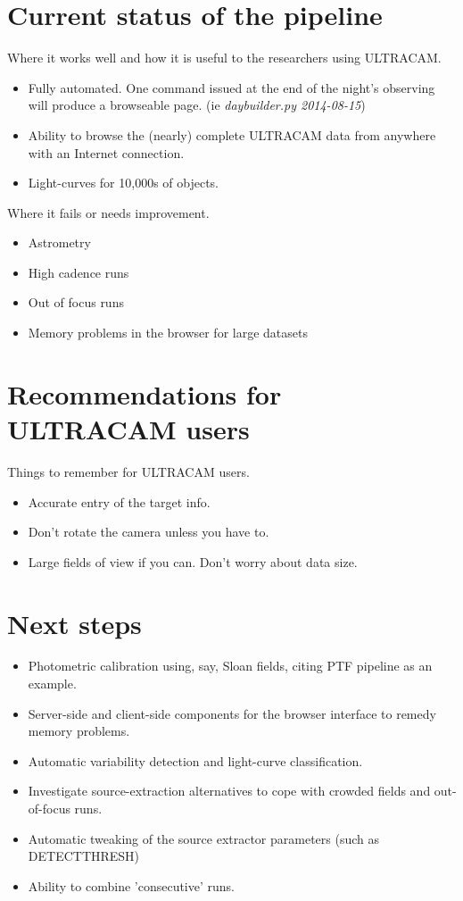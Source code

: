 
\section{Current status of the pipeline}

Where it works well and how it is useful to the researchers using ULTRACAM.
\begin{itemize}
  \item Fully automated. One command issued at the end of the night's observing will produce a browseable page. (ie \emph{daybuilder.py 2014-08-15})
  \item Ability to browse the (nearly) complete ULTRACAM data from anywhere with an Internet connection. 
  \item Light-curves for 10,000s of objects.
\end{itemize}

Where it fails or needs improvement.
\begin{itemize}
  \item Astrometry
  \item High cadence runs
  \item Out of focus runs
  \item Memory problems in the browser for large datasets 
\end{itemize}

\section{Recommendations for ULTRACAM users}

Things to remember for ULTRACAM users. 
\begin{itemize}
	\item Accurate entry of the target info.
	\item Don't rotate the camera unless you have to.
	\item Large fields of view if you can. Don't worry about data size. 
\end{itemize} 

\section{Next steps}
\begin{itemize}
	\item Photometric calibration using, say, Sloan fields, citing PTF pipeline as an example.
	\item Server-side and client-side components for the browser interface to remedy memory problems.
	\item Automatic variability detection and light-curve classification. 
	\item Investigate source-extraction alternatives to cope with crowded fields and out-of-focus runs.
	\item Automatic tweaking of the source extractor parameters (such as DETECT\textunderscore THRESH)
	\item Ability to combine 'consecutive' runs. 
\end{itemize} 
 


